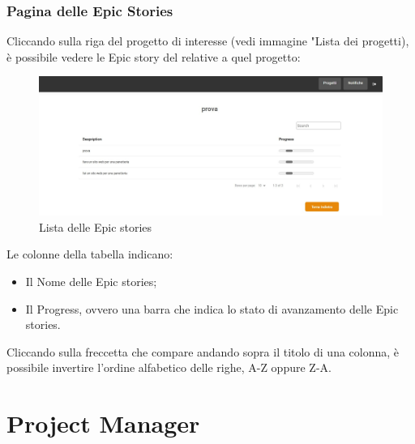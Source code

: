 \documentclass{article}
\begin{document}
\subsubsection{Pagina delle Epic Stories}
Cliccando sulla riga del progetto di interesse (vedi immagine "Lista dei progetti), è possibile vedere le Epic story del relative a quel progetto:
    \begin{figure}[H]
      \centering
      \includegraphics[width=\textwidth]{documenti/Screenshot manuale utente/epic dev.jpeg}
      \caption{Lista delle Epic stories}
      \label{listaepic}
    \end{figure} 
Le colonne della tabella indicano:
\begin{itemize}
    \item Il Nome delle Epic stories;
    \item Il Progress, ovvero una barra che indica lo stato di avanzamento delle Epic stories.
\end{itemize}
Cliccando sulla freccetta che compare andando sopra il titolo di una colonna, è possibile invertire l'ordine alfabetico delle righe, A-Z oppure Z-A.


\section{Project Manager}
\end{document}
